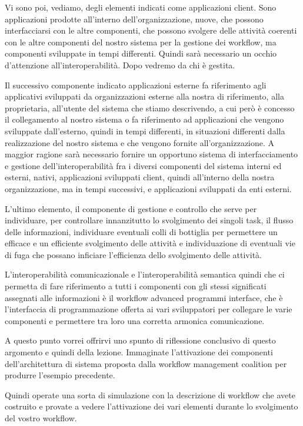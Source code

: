 Vi sono poi, vediamo, degli elementi indicati come applicazioni client.
Sono applicazioni prodotte all'interno dell'organizzazione, nuove, che possono interfacciarsi con le altre componenti, che possono svolgere delle attività coerenti con le altre componenti del nostro sistema per la gestione dei workflow, ma componenti sviluppate in tempi differenti.
Quindi sarà necessario un occhio d'attenzione all'interoperabilità.
Dopo vedremo da chi è gestita.

Il successivo componente indicato applicazioni esterne fa riferimento agli applicativi sviluppati da organizzazioni esterne alla nostra di riferimento, alla proprietaria, all'utente del sistema che stiamo descrivendo, a cui però è concesso il collegamento al nostro sistema o fa riferimento ad applicazioni che vengono sviluppate dall'esterno, quindi in tempi differenti, in situazioni differenti dalla realizzazione del nostro sistema e che vengono fornite all'organizzazione.
A maggior ragione sarà necessario fornire un opportuno sistema di interfacciamento e gestione dell'interoperabilità fra i diversi componenti del sistema interni ed esterni, nativi, applicazioni sviluppati client, quindi all'interno della nostra organizzazione, ma in tempi successivi, e applicazioni sviluppati da enti esterni.

L'ultimo elemento, il componente di gestione e controllo che serve per individuare, per controllare innanzitutto lo svolgimento dei singoli task, il flusso delle informazioni, individuare eventuali colli di bottiglia per permettere un efficace e un efficiente svolgimento delle attività e individuazione di eventuali vie di fuga che possano inficiare l'efficienza dello svolgimento delle attività.

L'interoperabilità comunicazionale e l'interoperabilità semantica quindi che ci permetta di fare riferimento a tutti i componenti con gli stessi significati assegnati alle informazioni è il workflow advanced programmi interface, che è l'interfaccia di programmazione offerta ai vari sviluppatori per collegare le varie componenti e permettere tra loro una corretta armonica comunicazione.

A questo punto vorrei offrirvi uno spunto di riflessione conclusivo di questo argomento e quindi della lezione.
Immaginate l'attivazione dei componenti dell'architettura di sistema proposta dalla workflow management coalition per produrre l'esempio precedente.

Quindi operate una sorta di simulazione con la descrizione di workflow che avete costruito e provate a vedere l'attivazione dei vari elementi durante lo svolgimento del vostro workflow.